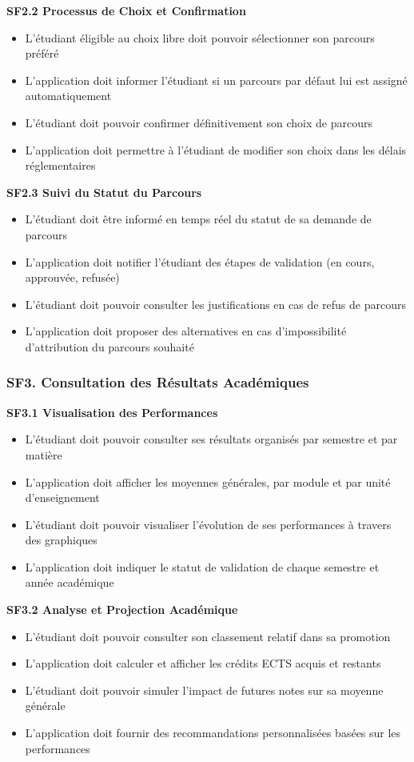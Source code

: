 \documentclass[12pt,a4paper]{report}
\begin{document}
\textbf{SF2.2 Processus de Choix et Confirmation}
\begin{itemize}
\item L'étudiant éligible au choix libre doit pouvoir sélectionner son parcours préféré
\item L'application doit informer l'étudiant si un parcours par défaut lui est assigné automatiquement
\item L'étudiant doit pouvoir confirmer définitivement son choix de parcours
\item L'application doit permettre à l'étudiant de modifier son choix dans les délais réglementaires
\end{itemize}

\textbf{SF2.3 Suivi du Statut du Parcours}
\begin{itemize}
\item L'étudiant doit être informé en temps réel du statut de sa demande de parcours
\item L'application doit notifier l'étudiant des étapes de validation (en cours, approuvée, refusée)
\item L'étudiant doit pouvoir consulter les justifications en cas de refus de parcours
\item L'application doit proposer des alternatives en cas d'impossibilité d'attribution du parcours souhaité
\end{itemize}

\subsubsection{SF3. Consultation des Résultats Académiques}

\textbf{SF3.1 Visualisation des Performances}
\begin{itemize}
\item L'étudiant doit pouvoir consulter ses résultats organisés par semestre et par matière
\item L'application doit afficher les moyennes générales, par module et par unité d'enseignement
\item L'étudiant doit pouvoir visualiser l'évolution de ses performances à travers des graphiques
\item L'application doit indiquer le statut de validation de chaque semestre et année académique
\end{itemize}

\textbf{SF3.2 Analyse et Projection Académique}
\begin{itemize}
\item L'étudiant doit pouvoir consulter son classement relatif dans sa promotion
\item L'application doit calculer et afficher les crédits ECTS acquis et restants
\item L'étudiant doit pouvoir simuler l'impact de futures notes sur sa moyenne générale
\item L'application doit fournir des recommandations personnalisées basées sur les performances
\end{itemize}
\end{document}
